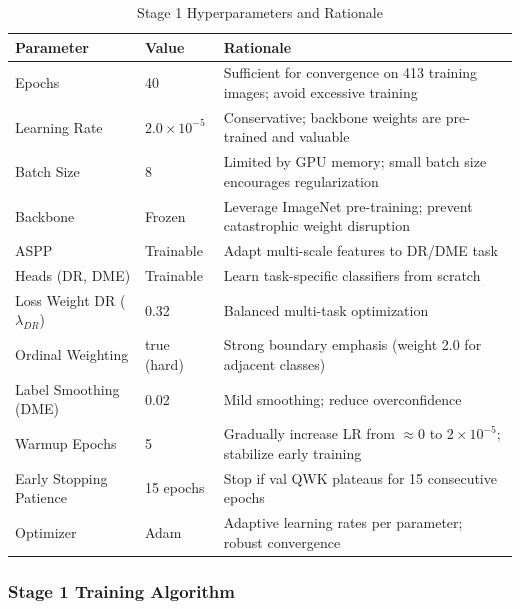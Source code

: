 \documentclass[12pt,a4paper]{article}
\begin{document}
\begin{table}[H]
\centering
\small
\caption{Stage 1 Hyperparameters and Rationale}
\begin{tabular}{|l|l|p{3.5cm}|}
\hline
\textbf{Parameter} & \textbf{Value} & \textbf{Rationale} \\
\hline
Epochs & 40 & Sufficient for convergence on 413 training images; avoid excessive training \\
Learning Rate & $2.0 \times 10^{-5}$ & Conservative; backbone weights are pre-trained and valuable \\
Batch Size & 8 & Limited by GPU memory; small batch size encourages regularization \\
Backbone & Frozen & Leverage ImageNet pre-training; prevent catastrophic weight disruption \\
ASPP & Trainable & Adapt multi-scale features to DR/DME task \\
Heads (DR, DME) & Trainable & Learn task-specific classifiers from scratch \\
\hline
Loss Weight DR ($\lambda_{DR}$) & 0.32 & Balanced multi-task optimization \\
Ordinal Weighting & true (hard) & Strong boundary emphasis (weight 2.0 for adjacent classes) \\
Label Smoothing (DME) & 0.02 & Mild smoothing; reduce overconfidence \\
Warmup Epochs & 5 & Gradually increase LR from $\approx 0$ to $2 \times 10^{-5}$; stabilize early training \\
Early Stopping Patience & 15 epochs & Stop if val QWK plateaus for 15 consecutive epochs \\
Optimizer & Adam & Adaptive learning rates per parameter; robust convergence \\
\hline
\end{tabular}
\end{table}

\subsubsection{Stage 1 Training Algorithm}
\end{document}
